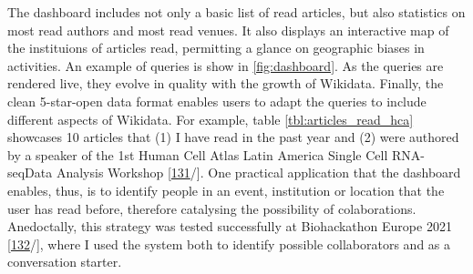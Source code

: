 The dashboard includes not only a basic list of read articles, but also statistics on most read authors and most read venues.
It also displays an interactive map of the instituions of articles read, permitting a glance on geographic biases in activities.
An example of queries is show in \ref{fig:dashboard}.
As the queries are rendered live, they evolve in quality with the growth of Wikidata.
Finally, the clean 5-star-open data format enables users to adapt the queries to include different aspects of Wikidata.
For example, table \ref{tbl:articles_read_hca} showcases 10 articles that (1) I have read in the past year and (2) were authored by a speaker of the 1st Human Cell Atlas Latin America Single Cell RNA-seqData Analysis Workshop {[}\protect\hyperlink{ref-1hag8XE6}{131}/{]}.
One practical application that the dashboard enables, thus, is to identify people in an event, institution or location that the user has read before, therefore catalysing the possibility of colaborations.
Anedoctally, this strategy was tested successfully at Biohackathon Europe 2021 {[}\protect\hyperlink{ref-kHL3NVxk}{132}/{]}, where I used the system both to identify possible collaborators and as a conversation starter.

